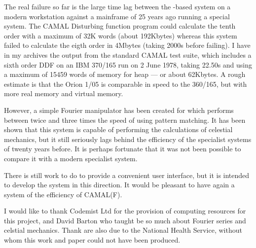 The real failure so far is the large time lag between the \REDUCE-based
system on a modern workstation against a mainframe of 25 years ago
running a special system.  The CAMAL Disturbing function program could
calculate the tenth order with a maximum of 32K words (about
192Kbytes) whereas this system failed to calculate the eigth order in
4Mbytes (taking 2000s before failing).  I have in my archives the
output from the standard CAMAL test suite, which includes a sixth
order DDF on an IBM 370/165 run on 2 June 1978, taking 22.50s and
using a maximum of 15459 words of memory for heap --- or about
62Kbytes.  A rough estimate is that the Orion 1/05 is comparable in
speed to the 360/165, but with more real memory and virtual memory.

However, a simple Fourier manipulator has been created for \REDUCE which
performs between twice and three times the speed of \REDUCE using
pattern matching.  It has been shown that this system is capable of
performing the calculations of celestial mechanics, but it still
seriously lags behind the efficiency of the specialist systems of
twenty years before.  It is perhaps fortunate that it was not been
possible to compare it with a modern specialist system.

There is still work to do to provide a convenient user interface, but
it is intended to develop the system in this direction.  It would be
pleasant to have again a system of the efficiency of CAMAL(F).

I would like to thank Codemist Ltd for the provision of computing
resources for this project, and David Barton who taught be so much
about Fourier series and celstial mechanics.  Thank are also due to
the National Health Service, without whom this work and paper could not
have been produced.

